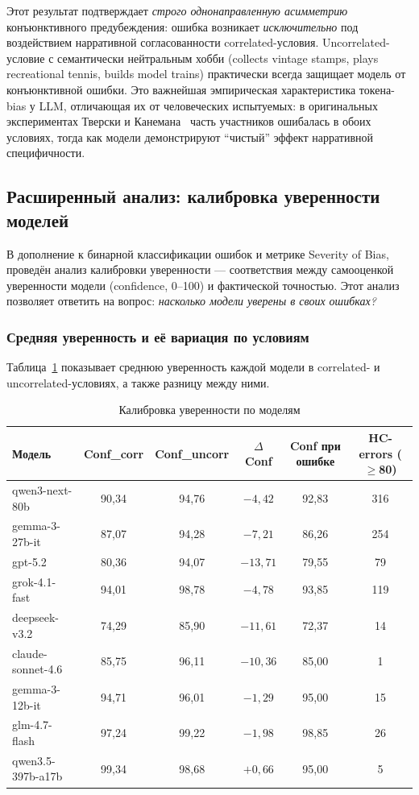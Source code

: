 Этот результат подтверждает \textit{строго однонаправленную асимметрию} конъюнктивного предубеждения: ошибка возникает \textit{исключительно} под воздействием нарративной согласованности correlated-условия. Uncorrelated-условие с семантически нейтральным хобби (collects vintage stamps, plays recreational tennis, builds model trains) практически всегда защищает модель от конъюнктивной ошибки. Это важнейшая эмпирическая характеристика токена-bias у LLM, отличающая их от человеческих испытуемых: в оригинальных экспериментах Тверски и Канемана~\cite{tversky1983extensional} часть участников ошибалась в обоих условиях, тогда как модели демонстрируют ``чистый'' эффект нарративной специфичности.

\subsection{Расширенный анализ: калибровка уверенности моделей}

В дополнение к бинарной классификации ошибок и метрике Severity of Bias, проведён анализ калибровки уверенности --- соответствия между самооценкой уверенности модели (confidence, 0--100) и фактической точностью. Этот анализ позволяет ответить на вопрос: \textit{насколько модели уверены в своих ошибках?}

\subsubsection*{Средняя уверенность и её вариация по условиям}

Таблица~\ref{tab:confidence_calibration} показывает среднюю уверенность каждой модели в correlated- и uncorrelated-условиях, а также разницу между ними.

\begin{table}[h!]
\caption{Калибровка уверенности по моделям}
\label{tab:confidence_calibration}
\centering
\begin{tabular}{|l|c|c|c|c|c|}
\hline
\textbf{Модель} & \textbf{Conf\_corr} & \textbf{Conf\_uncorr} & \textbf{$\Delta$Conf} & \textbf{Conf при ошибке} & \textbf{HC-errors ($\ge$80)} \\
\hline
qwen3-next-80b   & 90{,}34 & 94{,}76 & $-4{,}42$ & 92{,}83 & 316 \\
gemma-3-27b-it   & 87{,}07 & 94{,}28 & $-7{,}21$ & 86{,}26 & 254 \\
gpt-5.2          & 80{,}36 & 94{,}07 & $-13{,}71$ & 79{,}55 & 79 \\
grok-4.1-fast    & 94{,}01 & 98{,}78 & $-4{,}78$ & 93{,}85 & 119 \\
deepseek-v3.2    & 74{,}29 & 85{,}90 & $-11{,}61$ & 72{,}37 & 14 \\
claude-sonnet-4.6 & 85{,}75 & 96{,}11 & $-10{,}36$ & 85{,}00 & 1 \\
gemma-3-12b-it   & 94{,}71 & 96{,}01 & $-1{,}29$ & 95{,}00 & 15 \\
glm-4.7-flash    & 97{,}24 & 99{,}22 & $-1{,}98$ & 98{,}85 & 26 \\
qwen3.5-397b-a17b & 99{,}34 & 98{,}68 & $+0{,}66$ & 95{,}00 & 5 \\
\hline
\end{tabular}
\end{table}

